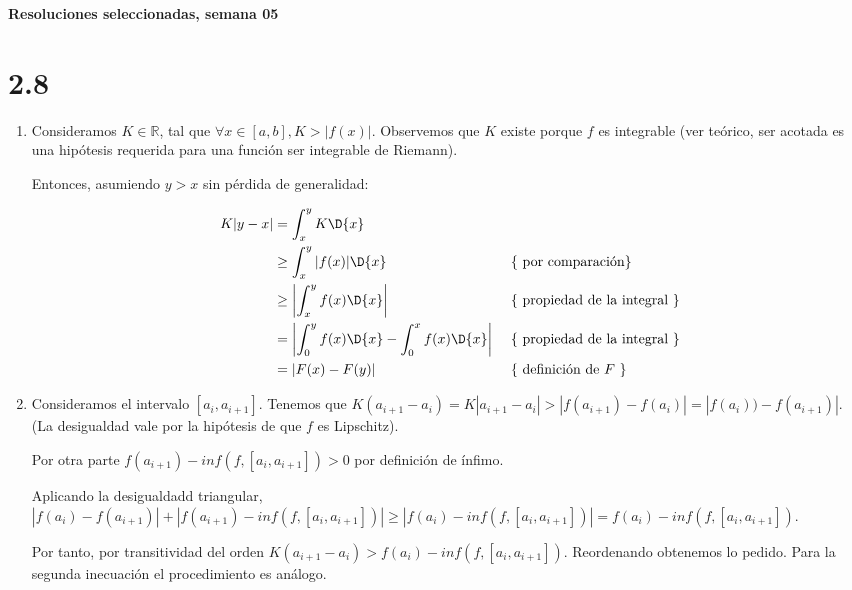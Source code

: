 \documentclass[10pt,a4paper]{article}
\newcommand{\R}{\mathbb{R}}
\begin{document}
\vspace{0,3cm}

\begin{center}
{\bf \Large Resoluciones seleccionadas, semana 05}
\end{center}


\vspace{0,3cm}

\section*{2.8}\emph{}%
\begin{enumerate}
\item
  Consideramos $K \in \R$, tal que $\forall x \in [a,b], K > |f(x)|$.
  Observemos que $K$ existe porque $f$ es integrable (ver te\'orico,
  ser acotada es una hip\'otesis requerida para una funci\'on ser
  integrable de Riemann).

  Entonces, asumiendo $y>x$ sin p\'erdida de generalidad:

  \begin{align*}
    K | y - x | & = \int_{x}^{y}{K \D{x}}  & &\\
    & \geq \int_{x}^{y}{|f(x)| \D{x}} & &\mbox{ \{ por comparaci\'on\}}\\
    & \geq \left| \int_{x}^{y}{f(x) \D{x}} \right|
    & &\mbox{ \{ propiedad de la integral \}}\\
    &= \left| \int_{0}^{y}{f(x) \D{x}} - \int_{0}^{x}{f(x) \D{x}} \right|
    & & \mbox{ \{ propiedad de la integral \}} \\
    &= \left|  F(x) - F(y) \right| & & \mbox{ \{ definici\'on de $F$ \}}
  \end{align*}

\item
  Consideramos el intervalo $[a_i, a_{i+1}]$.
  Tenemos que
  $K(a_{i+1} - a_i) = K|a_{i+1} - a_i| > |f(a_{i+1}) - f(a_i)| =
  |f(a_i)) - f(a_{i+1})|$. (La desigualdad vale por la hip\'otesis de que $f$
  es Lipschitz).

  Por otra parte $f(a_{i+1}) - inf(f,[a_i, a_{i+1}])>0$
  por definici\'on de \'infimo.

  Aplicando la desigualdadd triangular,
  $|f(a_i) - f(a_{i+1})| + |f(a_{i+1}) - inf(f,[a_i, a_{i+1}])|
  \geq | f(a_i)- inf(f,[a_i, a_{i+1}])| = f(a_i)- inf(f,[a_i, a_{i+1}])$.

  Por tanto, por transitividad del orden
  $K(a_{i+1} - a_i) > f(a_i)- inf(f,[a_i, a_{i+1}])$. Reordenando obtenemos lo
  pedido. Para la segunda inecuaci\'on el procedimiento es an\'alogo.


\end{enumerate}
\end{document}
